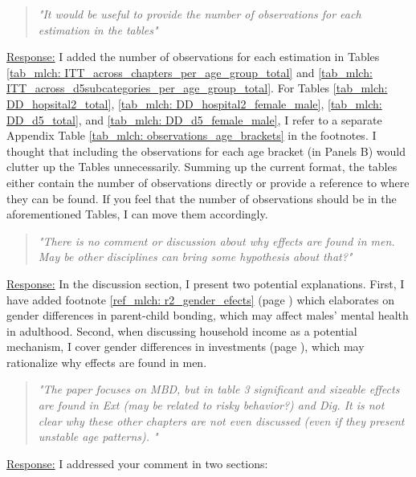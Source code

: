 \begin{quote}
	\textit{"It  would be useful to provide the number of observations for each estimation in the tables"}
\end{quote}
\underline{Response:} I added the number of observations for each estimation in Tables \ref{tab_mlch: ITT_across_chapters_per_age_group_total} and \ref{tab_mlch: ITT_across_d5subcategories_per_age_group_total}. For Tables \ref{tab_mlch: DD_hopsital2_total}, \ref{tab_mlch: DD_hospital2_female_male}, \ref{tab_mlch: DD_d5_total}, and \ref{tab_mlch: DD_d5_female_male}, I refer to a separate Appendix Table \ref{tab_mlch: observations_age_brackets} in the footnotes. I thought that including the observations for each age bracket (in Panels B) would clutter up the Tables unnecessarily. Summing up the current format, the tables either contain the number of observations directly or provide a reference to where they can be found. If you feel that the number of observations should be in the aforementioned Tables, I can move them accordingly.




\begin{quote}
	\textit{"There is no comment or discussion about why effects are found in men. May be other disciplines can bring some hypothesis about that?"}
\end{quote}
\underline{Response:}
In the discussion section, I present two potential explanations. First, I have added footnote \ref{ref_mlch: r2_gender_efects} (page \pageref{ref_mlch: r2_gender_efects}) which elaborates on gender differences in parent-child bonding, which may affect males' mental health in adulthood. Second, when discussing household income as a potential mechanism, I cover gender differences in investments (page \pageref{ref_mlch: r2_gender_diff_investments}), which may rationalize why effects are found in men. 







\begin{quote}
	\textit{"The paper focuses on MBD, but in table 3 significant and sizeable effects are found in Ext (may be related to risky behavior?) and Dig. It is not clear why these other chapters are not even discussed (even if they present unstable age patterns). "}
\end{quote}
\underline{Response:} I addressed your comment in two sections:

